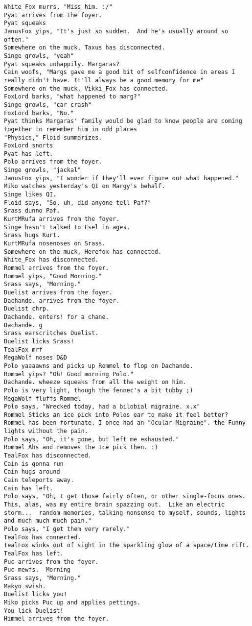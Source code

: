 \begin{verbatim}
White_Fox murrs, "Miss him. :/"
Pyat arrives from the foyer.
Pyat squeaks
JanusFox yips, "It's just so sudden.  And he's usually around so often."
Somewhere on the muck, Taxus has disconnected.
Singe growls, "yeah"
Pyat squeaks unhappily. Margaras?
Cain woofs, "Margs gave me a good bit of selfconfidence in areas I really didn't have. It'll always be a good memory for me"
Somewhere on the muck, Vikki_Fox has connected.
FoxLord barks, "what happened to marg?"
Singe growls, "car crash"
FoxLord barks, "No."
Pyat thinks Margaras' family would be glad to know people are coming together to remember him in odd places
"Physics," Floid summarizes.
FoxLord snorts
Pyat has left.
Polo arrives from the foyer.
Singe growls, "jackal"
JanusFox yips, "I wonder if they'll ever figure out what happened."
Miko watches yesterday's QI on Margy's behalf.
Singe likes QI.
Floid says, "So, uh, did anyone tell Paf?"
Srass dunno Paf.
KurtMRufa arrives from the foyer.
Singe hasn't talked to Esel in ages.
Srass hugs Kurt.
KurtMRufa nosenoses on Srass.
Somewhere on the muck, Herefox has connected.
White_Fox has disconnected.
Rommel arrives from the foyer.
Rommel yips, "Good Morning."
Srass says, "Morning."
Duelist arrives from the foyer.
Dachande. arrives from the foyer.
Duelist chrp.
Dachande. enters! for a chane.
Dachande. g
Srass earscritches Duelist.
Duelist licks Srass!
TealFox mrf
MegaWolf noses D&D
Polo yaaaawns and picks up Rommel to flop on Dachande.
Rommel yips? "Oh! Good morning Polo."
Dachande. wheeze squeaks from all the weight on him.
Polo is very light, though the fennec's a bit tubby ;)
MegaWolf fluffs Rommel
Polo says, "Wrecked today, had a bilobial migraine. x.x"
Rommel Sticks an ice pick into Polos ear to make it feel better?
Rommel has been fortunate. I once had an "Ocular Migraine". the Funny lights without the pain.
Polo says, "Oh, it's gone, but left me exhausted."
Rommel Ahs and removes the Ice pick then. :)
TealFox has disconnected.
Cain is gonna run
Cain hugs around
Cain teleports away.
Cain has left.
Polo says, "Oh, I get those fairly often, or other single-focus ones.  This, alas, was my entire brain spazzing out.  Like an electric storm...  random memories, talking nonsense to myself, sounds, lights and much much much pain."
Polo says, "I get them very rarely."
TealFox has connected.
TealFox winks out of sight in the sparkling glow of a space/time rift.
TealFox has left.
Puc arrives from the foyer.
Puc mewfs.  Morning
Srass says, "Morning."
Makyo swish.
Duelist licks you!
Miko picks Puc up and applies pettings.
You lick Duelist!
Himmel arrives from the foyer.

\end{verbatim}
